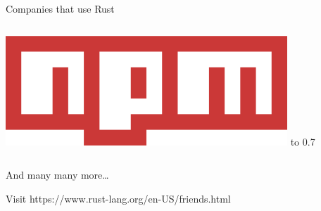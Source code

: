 \documentclass{beamer}
\begin{document}
\begin{frame}{Companies that use Rust}
\begin{columns}
{                \includegraphics[width=\textwidth]{npm}
            }
            \vbox to 0.7
        \end{columns}
        And many many more\dots

        Visit https://www.rust-lang.org/en-US/friends.html
    \end{frame}
\end{document}
